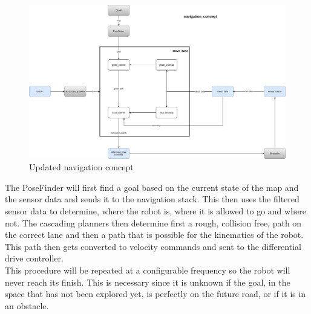 \begin{figure}[H]
	\begin{center}
		\includegraphics[width=140mm]{Pictures/Updated navigation concept}
		\caption[Updated navigation concept]{Updated navigation concept}
	\end{center}
\end{figure}



The PoseFinder will first find a goal based on the current state of the map and the sensor data and sends it to the navigation stack. This then uses the filtered sensor data to determine, where the robot is, where it is allowed to go and where not. The cascading planners then determine first a rough, collision free, path on the correct lane and then a path that is possible for the kinematics of the robot. This path then gets converted to velocity commands and sent to the differential drive controller.\\
This procedure will be repeated at a configurable frequency so the robot will never reach its finish. This is necessary since it is unknown if the goal, in the space that has not been explored yet, is perfectly on the future road, or if it is in an obstacle.




